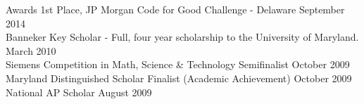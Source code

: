 \documentclass{resume} %
\begin{document}
\begin{rSection}{Awards}
1st Place, JP Morgan Code for Good Challenge - Delaware \hfill{September 2014}\\
Banneker Key Scholar - Full, four year scholarship to the University of Maryland.  \hfill { March 2010}   \\
Siemens Competition in Math, Science \& Technology Semifinalist \hfill {October 2009} \\
Maryland Distinguished Scholar Finalist (Academic Achievement) \hfill {October 2009}  \\
National AP Scholar \hfill { August 2009}  \\

\end{rSection}
\end{document}
